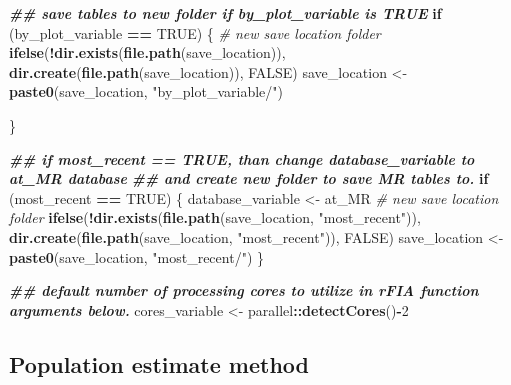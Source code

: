 \documentclass[
]{book}
\newenvironment{Shaded}{\begin{snugshade}}{\end{snugshade}}
\newcommand{\CommentTok}[1]{\textcolor[rgb]{0.56,0.35,0.01}{\textit{#1}}}
\newcommand{\ConstantTok}[1]{\textcolor[rgb]{0.56,0.35,0.01}{#1}}
\newcommand{\ControlFlowTok}[1]{\textcolor[rgb]{0.13,0.29,0.53}{\textbf{#1}}}
\newcommand{\DecValTok}[1]{\textcolor[rgb]{0.00,0.00,0.81}{#1}}
\newcommand{\DocumentationTok}[1]{\textcolor[rgb]{0.56,0.35,0.01}{\textbf{\textit{#1}}}}
\newcommand{\FunctionTok}[1]{\textcolor[rgb]{0.13,0.29,0.53}{\textbf{#1}}}
\newcommand{\NormalTok}[1]{#1}
\newcommand{\OtherTok}[1]{\textcolor[rgb]{0.56,0.35,0.01}{#1}}
\newcommand{\SpecialCharTok}[1]{\textcolor[rgb]{0.81,0.36,0.00}{\textbf{#1}}}
\newcommand{\StringTok}[1]{\textcolor[rgb]{0.31,0.60,0.02}{#1}}
\begin{document}
\begin{Shaded}
\begin{Highlighting}[]
\DocumentationTok{\#\# save tables to new folder if by\_plot\_variable is TRUE}
\ControlFlowTok{if}\NormalTok{ (by\_plot\_variable }\SpecialCharTok{==} \ConstantTok{TRUE}\NormalTok{) \{}
  \CommentTok{\# new save location folder}
  \FunctionTok{ifelse}\NormalTok{(}\SpecialCharTok{!}\FunctionTok{dir.exists}\NormalTok{(}\FunctionTok{file.path}\NormalTok{(save\_location)), }\FunctionTok{dir.create}\NormalTok{(}\FunctionTok{file.path}\NormalTok{(save\_location)), }\ConstantTok{FALSE}\NormalTok{)}
\NormalTok{  save\_location }\OtherTok{\textless{}{-}} \FunctionTok{paste0}\NormalTok{(save\_location, }\StringTok{"by\_plot\_variable/"}\NormalTok{)}
  
\NormalTok{\}}

\DocumentationTok{\#\# if \textquotesingle{}most\_recent == TRUE\textquotesingle{}, than change database\_variable to \textquotesingle{}at\_MR\textquotesingle{} database }
\DocumentationTok{\#\# and create new folder to save MR tables to. }
\ControlFlowTok{if}\NormalTok{ (most\_recent }\SpecialCharTok{==} \ConstantTok{TRUE}\NormalTok{) \{}
\NormalTok{  database\_variable }\OtherTok{\textless{}{-}}\NormalTok{ at\_MR}
  \CommentTok{\# new save location folder}
  \FunctionTok{ifelse}\NormalTok{(}\SpecialCharTok{!}\FunctionTok{dir.exists}\NormalTok{(}\FunctionTok{file.path}\NormalTok{(save\_location, }\StringTok{"most\_recent"}\NormalTok{)), }
         \FunctionTok{dir.create}\NormalTok{(}\FunctionTok{file.path}\NormalTok{(save\_location, }\StringTok{"most\_recent"}\NormalTok{)), }\ConstantTok{FALSE}\NormalTok{)}
\NormalTok{  save\_location }\OtherTok{\textless{}{-}} \FunctionTok{paste0}\NormalTok{(save\_location, }\StringTok{"most\_recent/"}\NormalTok{)}
\NormalTok{\}}

\DocumentationTok{\#\# default number of processing cores to utilize in rFIA function arguments below.}
\NormalTok{cores\_variable }\OtherTok{\textless{}{-}}\NormalTok{ parallel}\SpecialCharTok{::}\FunctionTok{detectCores}\NormalTok{()}\SpecialCharTok{{-}}\DecValTok{2}
\end{Highlighting}
\end{Shaded}

\hypertarget{population-estimate-method}{%
\subsection{Population estimate method}\label{population-estimate-method}}
\end{document}
